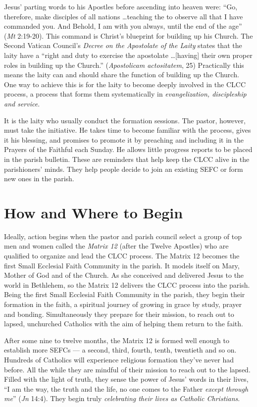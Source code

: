 \documentclass{article}
\begin{document}
Jesus' parting words to his Apostles before ascending into heaven were: ``Go,
therefore, make disciples of all nations \ldots teaching the to observe all that
I have commanded you. And Behold, I am with you always, until the end of the
age'' (\emph{Mt} 2:19-20). This command is Christ's blueprint for building up
his Church. The Second Vatican Council's \emph{Decree on the Apostolate of the
Laity} states that the laity have a ``right and duty to exercise the apostolate
\ldots [having] their own proper roles in building up the Church.''
(\emph{Apostolicam actositatem}, 25) Practically this means the laity can and
should share the function of building up the Church. One way to achieve this is
for the laity to become deeply involved in the CLCC process, a process that
forms them systematically in \emph{evangelization, discipleship and service}.

It is the laity who usually conduct the formation sessions. The pastor, however,
must take the initiative. He takes time to become familiar with the process,
gives it his blessing, and promises to promote it by preaching and including it
in the Prayers of the Faithful each Sunday. He allows little progress reports to
be placed in the parish bulletin. These are reminders that help keep the CLCC
alive in the parishioners' minds. They help people decide to join an existing
SEFC or form new ones in the parish.

\section{How and Where to Begin}

Ideally, action begins when the pastor and parish council select a group of top
men and women called the \emph{Matrix 12} (after the Twelve Apostles) who are
qualified to organize and lead the CLCC process. The Matrix 12 becomes the first
Small Ecclesial Faith Community in the parish. It models itself on Mary, Mother
of God and of the Church. As she conceived and delivered Jesus to the world in
Bethlehem, so the Matrix 12 delivers the CLCC process into the parish. Being the
first Small Ecclesial Faith Community in the parish, they begin their formation
in the faith, a spiritual journey of growing in grace by study, prayer and
bonding. Simultaneously they prepare for their mission, to reach out to lapsed,
unchurched Catholics with the aim of helping them return to the faith.

After some nine to twelve months, the Matrix 12 is formed well enough to
establish more SEFCs --- a second, third, fourth, tenth, twentieth and so
on. Hundreds of Catholics will experience religious formation they've never had
before. All the while they are mindful of their mission to reach out to the
lapsed. Filled with the light of truth, they sense the power of Jesus' words in
their lives, ``I am the way, the truth and the life, no one comes to the Father
\emph{except through me}'' (\emph{Jn} 14:4). They begin truly \emph{celebrating
their lives as Catholic Christians}.
\end{document}
